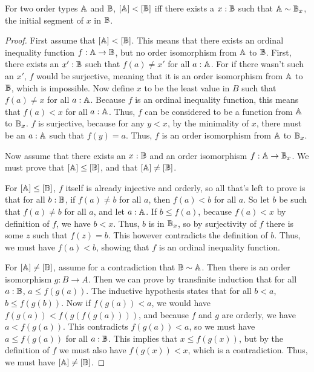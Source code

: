 \documentclass[../../math.tex]{subfiles}
\begin{document}
\begin{theorem} \label{ord_lt_simpl}
    For two order types $\mathbb{A}$ and $\mathbb{B}$, $[\mathbb{A}] < [\mathbb{B}]$ iff there exists a $x : \mathbb{B}$
    such that $\mathbb{A} \sim \mathbb{B}_x$, the initial segment of $x$ in $\mathbb{B}$.
\end{theorem}
\begin{proof}
    First assume that $[\mathbb{A}] < [\mathbb{B}]$.  This means that there exists an ordinal
    inequality function $f : \mathbb{A} \to \mathbb{B}$, but no order isomorphism from $\mathbb{A}$ to
    $\mathbb{B}$.  First, there exists an $x' : \mathbb{B}$ such that $f(a) \neq x'$ for all $a
    : \mathbb{A}$.  For if there wasn't such an $x'$, $f$ would be surjective, meaning
    that it is an order isomorphism from $\mathbb{A}$ to $\mathbb{B}$, which is impossible.  Now
    define $x$ to be the least value in $B$ such that $f(a) \neq x$ for all $a :
    \mathbb{A}$.  Because $f$ is an ordinal inequality function, this means that $f(a) <
    x$ for all $a : \mathbb{A}$.  Thus, $f$ can be considered to be a function from $\mathbb{A}$
    to $\mathbb{B}_x$.  $f$ is surjective, because for any $y < x$, by the minimality of
    $x$, there must be an $a : \mathbb{A}$ such that $f(y) = a$.  Thus, $f$ is an order
    isomorphism from $\mathbb{A}$ to $\mathbb{B}_x$.

    Now assume that there exists an $x : \mathbb{B}$ and an order isomorphism $f : \mathbb{A}
    \to \mathbb{B}_x$.  We must prove that $[\mathbb{A}] \leq [\mathbb{B}]$, and that $[\mathbb{A}] \neq [\mathbb{B}]$.

    For $[\mathbb{A}] \leq [\mathbb{B}]$, $f$ itself is already injective and orderly, so all
    that's left to prove is that for all $b : \mathbb{B}$, if $f(a) \neq b$ for all $a$,
    then $f(a) < b$ for all $a$.  So let $b$ be such that $f(a) \neq b$ for all
    $a$, and let $a : \mathbb{A}$.  If $b \leq f(a)$, because $f(a) < x$ by definition
    of $f$, we have $b < x$.  Thus, $b$ is in $\mathbb{B}_x$, so by surjectivity of $f$
    there is some $z$ such that $f(z) = b$.  This however contradicts the
    definition of $b$.  Thus, we must have $f(a) < b$, showing that $f$ is an
    ordinal inequality function.

    For $[\mathbb{A}] \neq [\mathbb{B}]$, assume for a contradiction that $\mathbb{B} \sim \mathbb{A}$.  Then
    there is an order isomorphism $g : B \to A$.  Then we can prove by
    transfinite induction that for all $a : \mathbb{B}$, $a \leq f(g(a))$.  The
    inductive hypothesis states that for all $b < a$, $b \leq f(g(b))$.  Now if
    $f(g(a)) < a$, we would have $f(g(a)) < f(g(f(g(a))))$, and because $f$ and
    $g$ are orderly, we have $a < f(g(a))$.  This contradicts $f(g(a)) < a$, so
    we must have $a \leq f(g(a))$ for all $a : \mathbb{B}$.  This implies that $x \leq
    f(g(x))$, but by the definition of $f$ we must also have $f(g(x)) < x$,
    which is a contradiction.  Thus, we must have $[\mathbb{A}] \neq [\mathbb{B}]$.
\end{proof}
\end{document}
